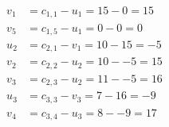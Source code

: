 \[
\begin{aligned}
v_{1} &= c_{1,1} - u_{1} = 15 - 0 = 15 \\
v_{5} &= c_{1,5} - u_{1} = 0 - 0 = 0 \\
u_{2} &= c_{2,1} - v_{1} = 10 - 15 = -5 \\
v_{2} &= c_{2,2} - u_{2} = 10 - -5 = 15 \\
v_{3} &= c_{2,3} - u_{2} = 11 - -5 = 16 \\
u_{3} &= c_{3,3} - v_{3} = 7 - 16 = -9 \\
v_{4} &= c_{3,4} - u_{3} = 8 - -9 = 17 \\
\end{aligned}
\]

